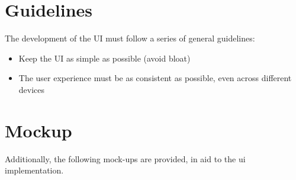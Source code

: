 \section{Guidelines}
The development of the UI must follow a series of general guidelines:
\begin{itemize}
 \item Keep the UI as simple as possible (avoid bloat)
 \item The user experience must be as consistent as possible, even across different devices
\end{itemize}

\section{Mockup}
Additionally, the following mock-ups are provided, in aid to the ui implementation.

